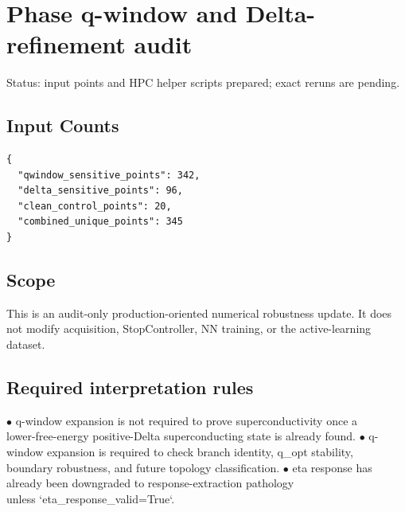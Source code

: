 \documentclass[11pt]{article}
\begin{document}
\section*{Phase q-window and Delta-refinement audit}

Status: input points and HPC helper scripts prepared; exact reruns are pending.

\subsection*{Input Counts}

\begin{verbatim}
{
  "qwindow_sensitive_points": 342,
  "delta_sensitive_points": 96,
  "clean_control_points": 20,
  "combined_unique_points": 345
}
\end{verbatim}

\subsection*{Scope}

This is an audit-only production-oriented numerical robustness update. It does
not modify acquisition, StopController, NN training, or the active-learning
dataset.

\subsection*{Required interpretation rules}

\noindent $\bullet$ q-window expansion is not required to prove superconductivity once a\\
  lower-free-energy positive-Delta superconducting state is already found.
\noindent $\bullet$ q-window expansion is required to check branch identity, q\_opt stability,\\
  boundary robustness, and future topology classification.
\noindent $\bullet$ eta response has already been downgraded to response-extraction pathology\\
  unless `eta\_response\_valid=True`.
\end{document}
